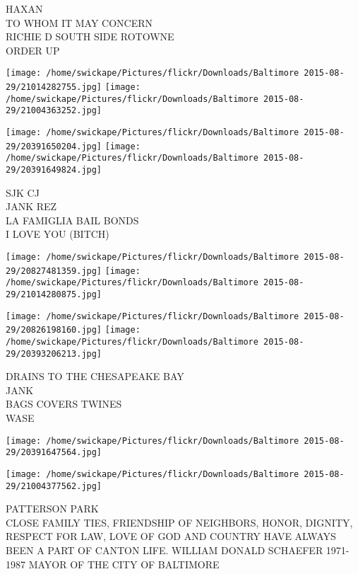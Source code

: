 \documentclass[10pt,letterpaper]{article}
\begin{document}
HAXAN\\
TO WHOM IT MAY CONCERN\\
RICHIE D SOUTH SIDE ROTOWNE\\
ORDER UP\\
\pagebreak

\texttt{[image: /home/swickape/Pictures/flickr/Downloads/Baltimore 2015-08-29/21014282755.jpg]}
\texttt{[image: /home/swickape/Pictures/flickr/Downloads/Baltimore 2015-08-29/21004363252.jpg]}

\texttt{[image: /home/swickape/Pictures/flickr/Downloads/Baltimore 2015-08-29/20391650204.jpg]}
\texttt{[image: /home/swickape/Pictures/flickr/Downloads/Baltimore 2015-08-29/20391649824.jpg]}

SJK CJ\\
JANK REZ\\
LA FAMIGLIA BAIL BONDS\\
I LOVE YOU (BITCH)\\
\pagebreak

\texttt{[image: /home/swickape/Pictures/flickr/Downloads/Baltimore 2015-08-29/20827481359.jpg]}
\texttt{[image: /home/swickape/Pictures/flickr/Downloads/Baltimore 2015-08-29/21014280875.jpg]}

\texttt{[image: /home/swickape/Pictures/flickr/Downloads/Baltimore 2015-08-29/20826198160.jpg]}
\texttt{[image: /home/swickape/Pictures/flickr/Downloads/Baltimore 2015-08-29/20393206213.jpg]}

DRAINS TO THE CHESAPEAKE BAY\\
JANK\\
BAGS COVERS TWINES\\
WASE\\
\pagebreak

\texttt{[image: /home/swickape/Pictures/flickr/Downloads/Baltimore 2015-08-29/20391647564.jpg]}

\vspace{0.25in}
\texttt{[image: /home/swickape/Pictures/flickr/Downloads/Baltimore 2015-08-29/21004377562.jpg]}

PATTERSON PARK\\
CLOSE FAMILY TIES, FRIENDSHIP OF NEIGHBORS, HONOR, DIGNITY, RESPECT FOR LAW, LOVE OF GOD AND COUNTRY HAVE ALWAYS BEEN A PART OF CANTON LIFE.  WILLIAM DONALD SCHAEFER 1971{-}1987 MAYOR OF THE CITY OF BALTIMORE\\
\pagebreak
\end{document}

